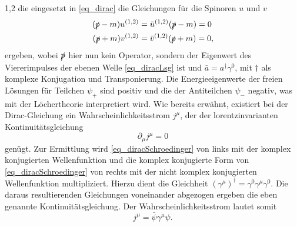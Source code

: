 \documentclass[11pt,a4paper,twoside]{report}
\begin{document}
\begin{spacing}{1,2}
die eingesetzt in \eqref{eq_dirac} die Gleichungen für die Spinoren $u$ und $v$
\begin{align}
 (\slashed{p} - m )u^{(1,2)} &= \bar u^{(1,2)}(\slashed{p}-m) = 0 \\
 (\slashed{p} + m )v^{(1,2)} &= \bar v^{(1,2)}(\slashed{p}+m) = 0,
\end{align}
ergeben, wobei $\slashed{p}$ hier nun kein Operator, sondern der Eigenwert des Viererimpulses der ebenen Welle \eqref{eq_diracLsg} ist und $\bar a = a^\dagger \gamma^0$,
 mit $\dagger$ als komplexe Konjugation und Transponierung. %
Die Energieeigenwerte der freien Lösungen für Teilchen $\psi_+$ sind positiv und die der Antiteilchen $\psi_-$ negativ, was mit der Löchertheorie interpretiert
wird. Wie bereits erwähnt, existiert bei der Dirac-Gleichung ein Wahrscheinlichkeitsstrom $j^\mu$, der der lorentzinvarianten Kontinuitätsgleichung
\begin{equation}
 \partial_\mu j^\mu = 0
\end{equation}
genügt. Zur Ermittlung wird \eqref{eq_diracSchroedinger} von links mit der komplex konjugierten Wellenfunktion und die komplex konjugierte
Form von \eqref{eq_diracSchroedinger} von rechts mit der nicht komplex konjugierten Wellenfunktion multipliziert. Hierzu dient die Gleichheit 
$(\gamma^\mu)^\dagger = \gamma^0\gamma^\mu\gamma^0$. Die daraus resultierenden Gleichungen voneinander abgezogen ergeben die eben genannte Kontinuitätsgleichung.
Der Wahrscheinlichkeitsstrom lautet somit
\begin{equation}
 j^\mu = \bar \psi \gamma^\mu \psi.
 \label{eq_diracstrom}
\end{equation}



\end{spacing}
\end{document}
